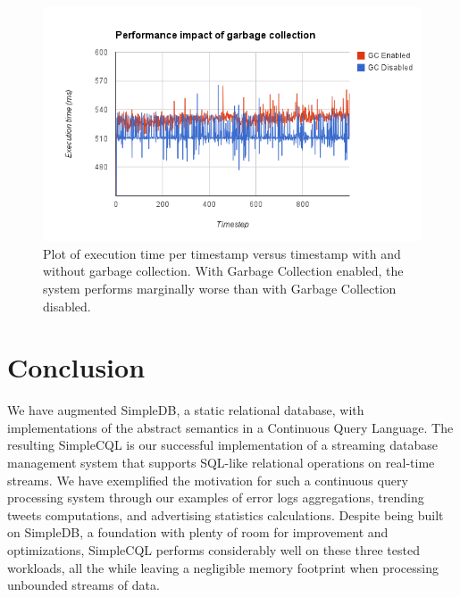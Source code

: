 \documentclass[a4paper, 10pt, conference]{IEEEconf}
\begin{document}
\begin{figure}[h!]
    \centering
    \centerline{\includegraphics[totalheight=5cm]{gc_perf.png}}
    \caption{Plot of execution time per timestamp versus timestamp with and without garbage collection. With Garbage Collection enabled, the system performs marginally worse than with Garbage Collection disabled.}
    \label{fig:gc_perf}
\end{figure}

\section{Conclusion}

We have augmented SimpleDB, a static relational database, with implementations of the abstract semantics in a Continuous Query Language. The resulting SimpleCQL is our successful implementation of a streaming database management system that supports SQL-like relational operations on real-time streams. We have exemplified the motivation for such a continuous query processing system through our examples of error logs aggregations, trending tweets computations, and advertising statistics calculations. Despite being built on SimpleDB, a foundation with plenty of room for improvement and optimizations, SimpleCQL performs considerably well on these three tested workloads, all the while leaving a negligible memory footprint when processing unbounded streams of data.



\end{document}
